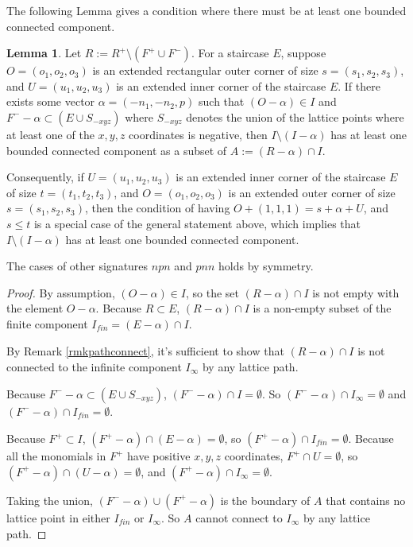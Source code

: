 \documentclass{amsart}[10pt]
\theoremstyle{plain}
\theoremstyle{definition}
\newtheorem{lemma}[theorem]{Lemma}
\begin{document}
The following Lemma gives a condition where there must be at least one bounded connected component. 

\begin{lemma}
\label{bigimportantlemma}
Let $R:= R^+ \setminus (F^+ \cup F^-)$. For a staircase $E$, suppose $O=(o_1,o_2,o_3)$ is an extended rectangular outer corner of size $s=(s_1, s_2, s_3)$, and $U=(u_1, u_2,u_3)$ is an extended inner corner of the staircase $E$. If there exists some vector $\alpha=(-n_1,-n_2, p)$ such that $(O-\alpha) \in I$ and $F^- -\alpha \subset (E \cup S_{-xyz})$ where $S_{-xyz}$ denotes the union of the lattice points where at least one of the $x,y,z$ coordinates is negative, then $I \setminus (I-\alpha)$ has at least one bounded connected component as a subset of $A:=(R-\alpha) \cap I$.

Consequently, if $U=(u_1, u_2,u_3)$ is an extended inner corner of the staircase $E$ of size $t=(t_1, t_2, t_3)$, and $O=(o_1,o_2,o_3)$ is an extended outer corner of size $s=(s_1, s_2, s_3)$, then the condition of having $O+(1,1,1)=s+\alpha+U$, and $s \leq t$ is a special case of the general statement above, which implies that $I \setminus (I-\alpha)$ has at least one bounded connected component.


The cases of other signatures $npn$ and $pnn$ holds by symmetry. 
\end{lemma}

\begin{proof}
By assumption, $(O-\alpha) \in I$, so the set $(R-\alpha) \cap I$ is not empty with the element $O-\alpha$. Because $R \subset E$, $(R-\alpha) \cap I$ is a non-empty subset of the finite component $I_{\textit{fin}}=(E-\alpha) \cap I$. 



By Remark \ref{rmkpathconnect}, it's sufficient to show that $(R-\alpha) \cap I$ is not connected to the infinite component $I_\infty$ by any lattice path. 

Because $F^--\alpha \subset (E \cup S_{-xyz})$, $(F^--\alpha) \cap I = \emptyset$. So $(F^--\alpha) \cap I_\infty = \emptyset$ and $(F^--\alpha) \cap I_{\textit{fin}} = \emptyset$.

Because $F^+ \subset I$, $(F^+ - \alpha) \cap (E-\alpha)=\emptyset$, so $(F^+-\alpha) \cap I_{\textit{fin}} = \emptyset$. Because all the monomials in $F^+$ have positive $x,y,z$ coordinates, $F^+ \cap U = \emptyset$, so $(F^+-\alpha) \cap (U-\alpha)=\emptyset$, and $(F^+-\alpha) \cap I_\infty=\emptyset$.


Taking the union, $(F^--\alpha) \cup (F^+ - \alpha)$ is the boundary of $A$ that contains no lattice point in either $I_{\textit{fin}}$ or $I_\infty$. So $A$ cannot connect to $I_\infty$ by any lattice path.

\end{proof}
\end{document}
